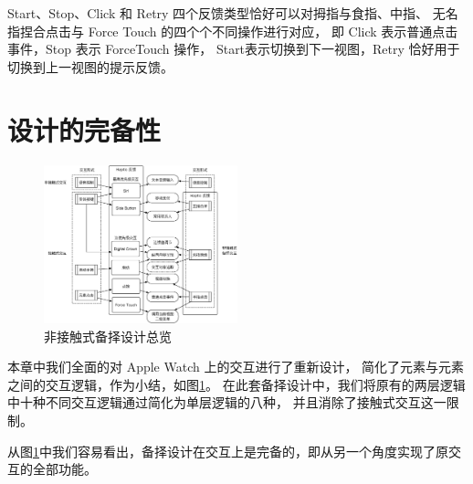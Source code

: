 Start、Stop、Click 和 Retry 四个反馈类型恰好可以对拇指与食指、中指、
无名指捏合点击与 Force Touch 的四个个不同操作进行对应，
即 Click 表示普通点击事件，Stop 表示 ForceTouch 操作，
Start表示切换到下一视图，Retry 恰好用于切换到上一视图的提示反馈。

\section{设计的完备性}
\label{sec:completeless}



\begin{figure}[H]
    \kaishu
    \centering
    \includegraphics[width=0.5\textwidth]{figures/interaction}
    \caption{\kaishu 非接触式备择设计总览}
    \label{fig:interaction}
\end{figure}

本章中我们全面的对 Apple Watch 上的交互进行了重新设计，
简化了元素与元素之间的交互逻辑，作为小结，如图\ref{fig:interaction}。
在此套备择设计中，我们将原有的两层逻辑中十种不同交互逻辑通过简化为单层逻辑的八种，
并且消除了接触式交互这一限制。

从图\ref{fig:interaction}中我们容易看出，备择设计在交互上是完备的，即从另一个角度实现了原交互的全部功能。
